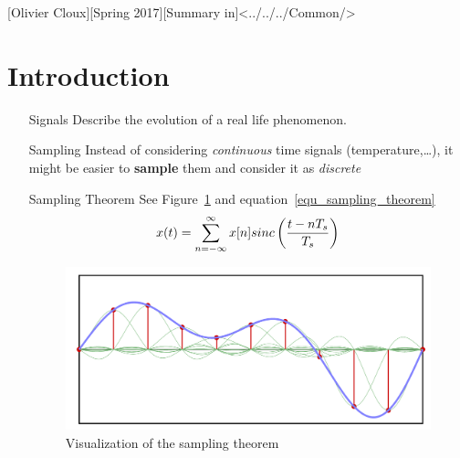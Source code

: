 \documentclass[11pt,a4paper]{article}
\begin{document}
[Olivier Cloux][Spring 2017][Summary in]<../../../Common/>
\setlength{\abovedisplayskip}{0.1cm}
\setlength{\belowdisplayskip}{0.1cm}
\setlength{\multicolsep}{0pt}
\setlength{\columnsep}{-80pt}
\tableofcontents
\newpage
\section{Introduction}
\begin{itemize}
	\setlength\itemsep{-0.2em}

	\item[Signals] Describe the evolution of a real life phenomenon.

	\item[Sampling] Instead of considering \textit{continuous} time signals (temperature,\ldots), it might be easier to \textbf{sample} them and consider it as \textit{discrete}

	\item[Sampling Theorem] See Figure~\ref{fig_sampling_theorem} and equation~\ref{equ_sampling_theorem}
	      \begin{equation}
		      x(t) = \somme{\infty}{n=-\infty} x[n] sinc\left(\frac{t-nT_s}{T_s}\right)%
		      \label{equ_sampling_theorem}
	      \end{equation}
	      \begin{figure}
		      \centering
		      \includegraphics[scale=0.2]{images/sampling_theorem}
		      \caption{Visualization of the sampling theorem}%
		      \label{fig_sampling_theorem}
	      \end{figure}


\end{itemize}
\end{document}
